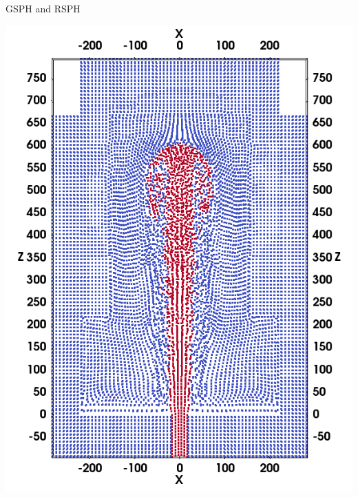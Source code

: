 \documentclass{beamer}
\begin{document}
\begin{frame}{GSPH and RSPH}
\begin{minipage}[b][][b]{.25 \textwidth}
        \includegraphics[width=0.99 \textwidth]{./Chapter-4/Figures/GSPH-HLLC-t3-cutView}
    \end{minipage}%
    \centering
    \begin{minipage}[b][][b]{.25 \textwidth}

\end{minipage}
\end{frame}
\end{document}
